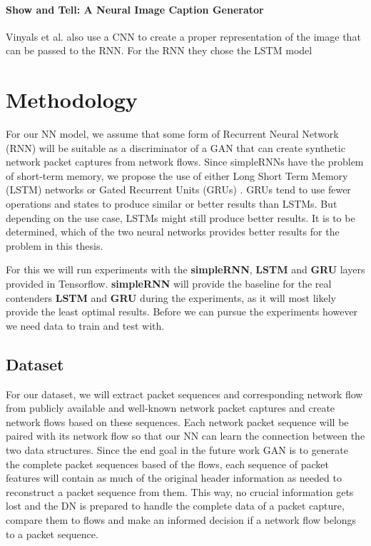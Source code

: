 \documentclass[
	ngerman,
	ruledheaders=section,%
	class=report,%
	thesis={type=bachelor},%
	accentcolor=9c,%
	custommargins=true,%
	marginpar=false,%
	parskip=half-,%
	fontsize=11pt,%
	twoside
]{tudapub}
\begin{document}
\subsubsection{Show and Tell: A Neural Image Caption Generator} %
\label{sec:vinyals}

Vinyals et al. also use a CNN to create a proper representation of the image that can be passed to the RNN.
For the RNN they chose the LSTM model

\chapter{Methodology}
\label{sec:approach}
\label{sec:methodology}

For our NN model, we assume that some form of Recurrent Neural Network (RNN) will be suitable as a discriminator of a GAN that can create synthetic network packet captures from network flows.
Since simpleRNNs have the problem of short-term memory, we propose the use of either Long Short Term Memory (LSTM) networks \cite{hochreiterLongShortTermMemory1997} or Gated Recurrent Units (GRUs) \cite{bahdanauNeuralMachineTranslation2016}.
GRUs tend to use fewer operations and states to produce similar or better results than LSTMs.
But depending on the use case, LSTMs might still produce better results.
It is to be determined, which of the two neural networks provides better results for the problem in this thesis.

For this we will run experiments with the \textbf{simpleRNN}, \textbf{LSTM} and \textbf{GRU} layers provided in Tensorflow.
\textbf{simpleRNN} will provide the baseline for the real contenders \textbf{LSTM} and \textbf{GRU} during the experiments, as it will most likely provide the least optimal results.
Before we can pursue the experiments however we need data to train and test with.

\section{Dataset}
\label{sec:dataset}

For our dataset, we will extract packet sequences and corresponding network flow from publicly available and well-known network packet captures and create network flows based on these sequences.
Each network packet sequence will be paired with its network flow so that our NN can learn the connection between the two data structures.
Since the end goal in the future work GAN is to generate the complete packet sequences based of the flows,
each sequence of packet features will contain as much of the original header information as needed to reconstruct a packet sequence from them.
This way, no crucial information gets lost and the DN is prepared to handle the complete data of a packet capture, compare them to flows and make an informed decision if a network flow belongs to a packet sequence.
\end{document}
